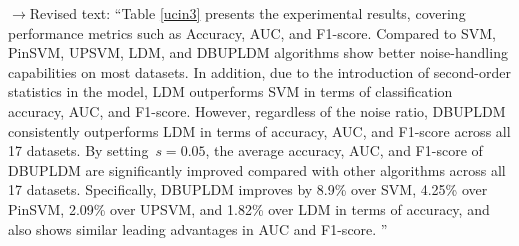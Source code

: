 \documentclass[journal,12pn, onecolumn]{IEEEtran}
\begin{document}
{{{{\color{orange}$\longrightarrow$Revised text: ``Table \ref{ucin3} presents the experimental results, covering performance metrics such as Accuracy, AUC, and F1-score. } Compared to SVM, PinSVM, UPSVM, LDM, and DBUPLDM algorithms show better noise-handling capabilities on most datasets. {\color{orange}In addition, due to the introduction of second-order statistics in the model, LDM outperforms SVM in terms of classification accuracy, AUC, and F1-score. However, regardless of the noise ratio, DBUPLDM consistently outperforms LDM in terms of accuracy, AUC, and F1-score across all 17 datasets. By setting \(s = 0.05\), the average accuracy, AUC, and F1-score of DBUPLDM are significantly improved compared with other algorithms across all 17 datasets. Specifically, DBUPLDM improves by 8.9\% over SVM, 4.25\% over PinSVM, 2.09\% over UPSVM, and 1.82\% over LDM in terms of accuracy, and also shows similar leading advantages in AUC and F1-score. 
''}\\



}}}
\end{document}
